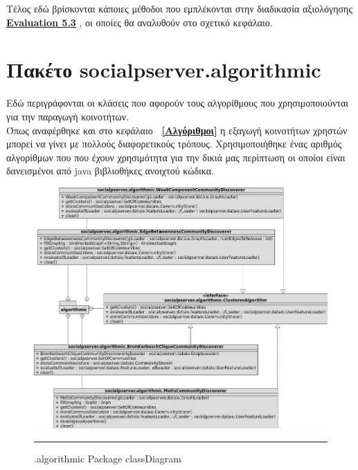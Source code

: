 Τέλος εδώ βρίσκονται κάποιες μέθοδοι που εμπλέκονται στην διαδικασία αξιολόγησης \textbf{\hyperref[eval]{Εvaluation 5.3} }, οι οποίες θα αναλυθούν
στο σχετικό κεφάλαιο.


\section{Πακέτο socialpserver.algorithmic}
\label{socialpserver.algorithmic}
\noindent
Εδώ περιγράφονται οι κλάσεις που αφορούν τους αλγορίθμους που χρησιμοποιούνται για την παραγωγή κοινοτήτων.\\

Όπως αναφέρθηκε και στο κεφάλαιο \textbf{~\ref{Αλγόριθμοι}}  η εξαγωγή κοινοτήτων χρηστών 
μπορεί να γίνει με πολλούς διαφορετικούς τρόπους.
Χρησιμοποιήθηκε ένας αριθμός αλγορίθμων που  που έχουν χρησιμότητα για την δικιά μας περίπτωση 
οι οποίοι είναι δανεισμένοι από java βιβλιοθήκες ανοιχτού κώδικα.


\begin{figure}[htbp]
  \hspace{-4.0em}    
    \includegraphics[scale=0.80]{Figures/algorithmicClassDiagram.png}
	\rule{35em}{0.5pt}  %
	\caption[algorithmicClassDiagram]{.algorithmic Package classDiagram}
  \label{fig:algorithmicClassDiagram}  
\end{figure}



